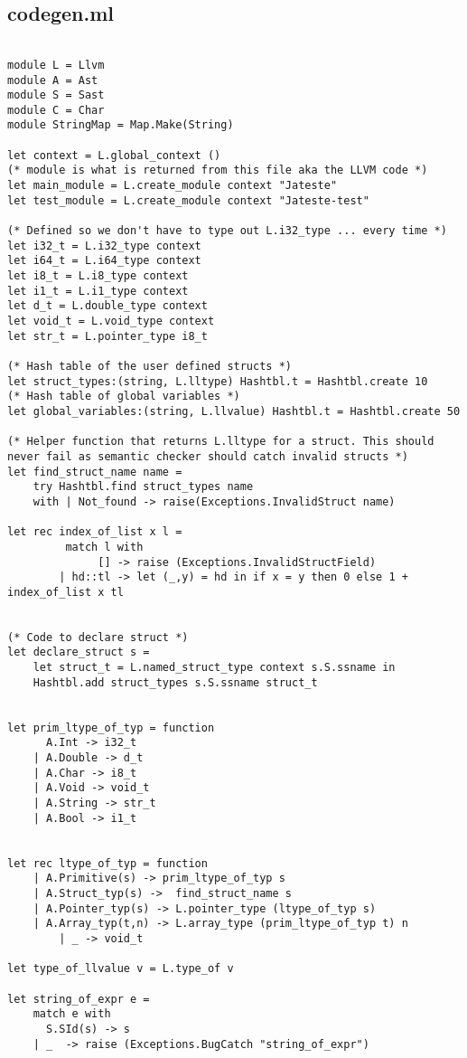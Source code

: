 \documentclass{article}
\begin{document}
\subsection{codegen.ml}
\begin{lstlisting}

module L = Llvm
module A = Ast
module S = Sast
module C = Char
module StringMap = Map.Make(String)

let context = L.global_context () 
(* module is what is returned from this file aka the LLVM code *)
let main_module = L.create_module context "Jateste" 
let test_module = L.create_module context "Jateste-test" 

(* Defined so we don't have to type out L.i32_type ... every time *)
let i32_t = L.i32_type context
let i64_t = L.i64_type context
let i8_t = L.i8_type context
let i1_t = L.i1_type context
let d_t = L.double_type context
let void_t = L.void_type context
let str_t = L.pointer_type i8_t 

(* Hash table of the user defined structs *)
let struct_types:(string, L.lltype) Hashtbl.t = Hashtbl.create 10
(* Hash table of global variables *)
let global_variables:(string, L.llvalue) Hashtbl.t = Hashtbl.create 50

(* Helper function that returns L.lltype for a struct. This should never fail as semantic checker should catch invalid structs *)
let find_struct_name name = 
	try Hashtbl.find struct_types name
	with | Not_found -> raise(Exceptions.InvalidStruct name)

let rec index_of_list x l = 
         match l with
           	  [] -> raise (Exceptions.InvalidStructField)
 		| hd::tl -> let (_,y) = hd in if x = y then 0 else 1 + index_of_list x tl


(* Code to declare struct *)
let declare_struct s =
	let struct_t = L.named_struct_type context s.S.ssname in
	Hashtbl.add struct_types s.S.ssname struct_t


let prim_ltype_of_typ = function
	  A.Int -> i32_t
	| A.Double -> d_t
	| A.Char -> i8_t
	| A.Void -> void_t
	| A.String -> str_t
	| A.Bool -> i1_t


let rec ltype_of_typ = function
	| A.Primitive(s) -> prim_ltype_of_typ s
	| A.Struct_typ(s) ->  find_struct_name s
	| A.Pointer_typ(s) -> L.pointer_type (ltype_of_typ s)
	| A.Array_typ(t,n) -> L.array_type (prim_ltype_of_typ t) n
    	| _ -> void_t 

let type_of_llvalue v = L.type_of v

let string_of_expr e =
	match e with
	  S.SId(s) -> s
	| _  -> raise (Exceptions.BugCatch "string_of_expr")


\end{lstlisting}
\end{document}
